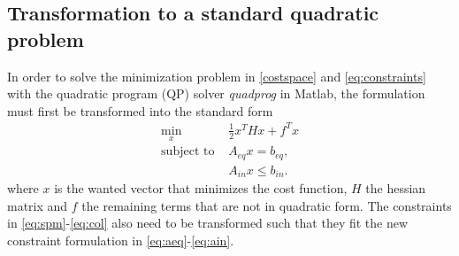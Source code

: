 \documentclass[letterpaper,10pt,conference]{ieeeconf}
\begin{document}
\subsection{Transformation to a standard quadratic problem}
In order to solve the minimization problem in \eqref{costspace} and \eqref{eq:constraints} with the quadratic program (QP) solver \emph{quadprog} in Matlab, the formulation must first be transformed into the standard form 
\begin{subequations} \label{stform}
\begin{align}\label{eq:quad}
\min_{x}& \frac{1}{2}x^THx+f^Tx\\
\text{subject to } 
&A_{eq}x =b_{eq},\label{eq:aeq}\\
&A_{in}x \leq b_{in}.\label{eq:ain}
\end{align}
\end{subequations}
where $x$ is the wanted vector that minimizes the cost function, $H$ the hessian matrix and $f$ the remaining terms that are not in quadratic form. The constraints in \eqref{eq:spm}-\eqref{eq:col} also need to be transformed such that they fit the new constraint formulation in \eqref{eq:aeq}-\eqref{eq:ain}.
\end{document}
